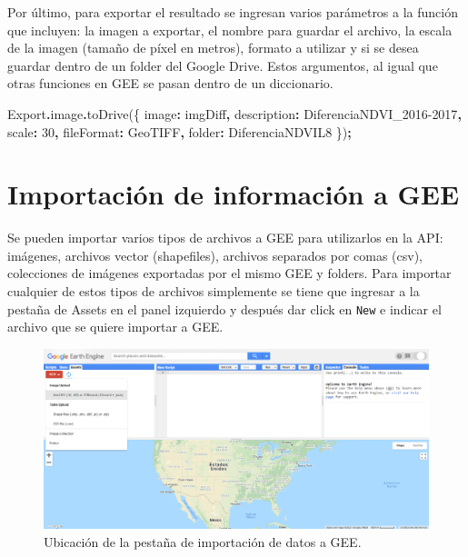 \documentclass[
  12pt,
  letterpaper,
  twoside]{book}
\newenvironment{Shaded}{\begin{snugshade}}{\end{snugshade}}
\newcommand{\AttributeTok}[1]{\textcolor[rgb]{0.77,0.63,0.00}{#1}}
\newcommand{\DataTypeTok}[1]{\textcolor[rgb]{0.13,0.29,0.53}{#1}}
\newcommand{\DecValTok}[1]{\textcolor[rgb]{0.00,0.00,0.81}{#1}}
\newcommand{\FunctionTok}[1]{\textcolor[rgb]{0.00,0.00,0.00}{#1}}
\newcommand{\NormalTok}[1]{#1}
\newcommand{\OperatorTok}[1]{\textcolor[rgb]{0.81,0.36,0.00}{\textbf{#1}}}
\newcommand{\StringTok}[1]{\textcolor[rgb]{0.31,0.60,0.02}{#1}}
\begin{document}
Por último, para exportar el resultado se ingresan varios parámetros a la función que incluyen: la imagen a exportar, el nombre para guardar el archivo, la escala de la imagen (tamaño de píxel en metros), formato a utilizar y si se desea guardar dentro de un folder del Google Drive. Estos argumentos, al igual que otras funciones en GEE se pasan dentro de un diccionario.

\begin{Shaded}
\begin{Highlighting}[]
\NormalTok{Export}\OperatorTok{.}\AttributeTok{image}\OperatorTok{.}\FunctionTok{toDrive}\NormalTok{(\{}
  \DataTypeTok{image}\OperatorTok{:}\NormalTok{ imgDiff}\OperatorTok{,}
  \DataTypeTok{description}\OperatorTok{:} \StringTok{\textquotesingle{}DiferenciaNDVI\_2016{-}2017\textquotesingle{}}\OperatorTok{,}
  \DataTypeTok{scale}\OperatorTok{:} \DecValTok{30}\OperatorTok{,}
  \DataTypeTok{fileFormat}\OperatorTok{:} \StringTok{\textquotesingle{}GeoTIFF\textquotesingle{}}\OperatorTok{,}
  \DataTypeTok{folder}\OperatorTok{:} \StringTok{\textquotesingle{}DiferenciaNDVIL8\textquotesingle{}}
\NormalTok{\})}\OperatorTok{;} 
\end{Highlighting}
\end{Shaded}

\newpage

\hypertarget{importaciuxf3n-de-informaciuxf3n-a-gee}{%
\chapter{Importación de información a GEE}\label{importaciuxf3n-de-informaciuxf3n-a-gee}}

Se pueden importar varios tipos de archivos a GEE para utilizarlos en la API: imágenes, archivos vector (shapefiles), archivos separados por comas (csv), colecciones de imágenes exportadas por el mismo GEE y folders. Para importar cualquier de estos tipos de archivos simplemente se tiene que ingresar a la pestaña de Assets en el panel izquierdo y después dar click en \texttt{New} e indicar el archivo que se quiere importar a GEE.

\begin{figure}

{\centering \includegraphics[width=1\linewidth]{Img/Asset1} 

}

\caption{Ubicación de la pestaña de importación de datos a GEE.}\label{fig:unnamed-chunk-166}
\end{figure}
\end{document}

